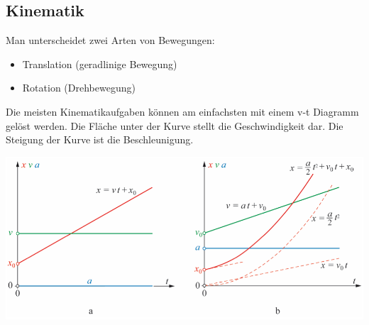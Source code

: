 
\subsection{Kinematik}
Man unterscheidet zwei Arten von Bewegungen:
\begin{itemize}
	\item Translation (geradlinige Bewegung)
	\item Rotation (Drehbewegung)
\end{itemize}

Die meisten Kinematikaufgaben können am einfachsten mit einem v-t Diagramm gelöst werden. Die Fläche unter der Kurve stellt die Geschwindigkeit dar. Die Steigung der Kurve ist die Beschleunigung.

\includegraphics[width=0.7\linewidth]{images/kinematik}



\clearpage

